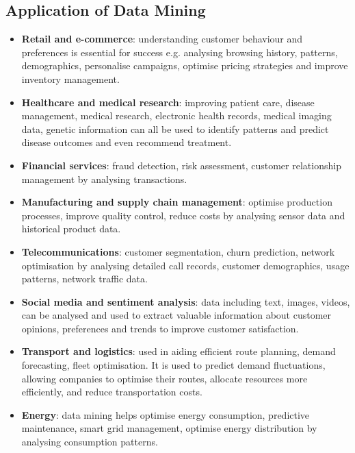 \documentclass[a4paper, 12pt]{article}
\theoremstyle{plain}
\theoremstyle{definition}
\theoremstyle{remark}
\begin{document}
\subsection{Application of Data Mining}
\begin{itemize}
	\item \textbf{Retail and e-commerce}: understanding customer behaviour and preferences is essential for success e.g. analysing browsing history, patterns, demographics, personalise campaigns, optimise pricing strategies and improve inventory management.
	\item \textbf{Healthcare and medical research}: improving patient care, disease management, medical research, electronic health records, medical imaging data, genetic information can all be used to identify patterns and predict disease outcomes and even recommend treatment.
	\item \textbf{Financial services}: fraud detection, risk assessment, customer relationship management by analysing transactions.
	\item \textbf{Manufacturing and supply chain management}: optimise production processes, improve quality control, reduce costs by analysing sensor data and historical product data.
	\item \textbf{Telecommunications}: customer segmentation, churn prediction, network optimisation by analysing detailed call records, customer demographics, usage patterns, network traffic data.
	\item \textbf{Social media and sentiment analysis}: data including text, images, videos, can be analysed and used to extract valuable information about customer opinions, preferences and trends to improve customer satisfaction.
	\item \textbf{Transport and logistics}: used in aiding efficient route planning, demand forecasting, fleet optimisation. It is used to predict demand fluctuations, allowing companies to optimise their routes, allocate resources more efficiently, and reduce transportation costs.
	\item \textbf{Energy}: data mining helps optimise energy consumption, predictive maintenance, smart grid management, optimise energy distribution by analysing consumption patterns. 
\end{itemize}
\end{document}
